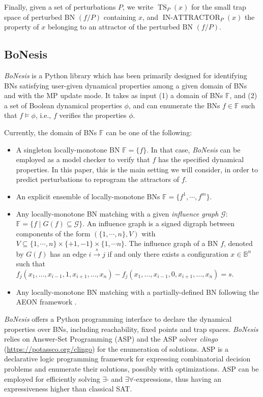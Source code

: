 \documentclass[PCJ,Unicode,screen,mode=plain]{cedram}
\begin{document}
Finally, given a set of perturbations \(P\), we write
\(\operatorname{TS}_P(x)\) for the small trap space of perturbed BN
\((f/P)\) containing \(x\), and \(\operatorname{IN-ATTRACTOR}_P(x)\) the
property of \(x\) belonging to an attractor of the perturbed BN
\((f/P)\).
\hypertarget{bonesis}{%
\subsection{BoNesis}\label{bonesis}}

\emph{BoNesis} \citep{BoNesis} is a Python library which has been primarily designed for identifying BNs satisfying
user-given dynamical properties among a given domain of BNs and with the MP update mode. It takes as
input (1) a domain of BNs
\(\mathbb F\), and (2) a set of Boolean dynamical properties \(\phi\),
and can enumerate the BNs \(f \in \mathbb F\) such that
\(f\models \phi\), i.e., \(f\) verifies the properties \(\phi\).

Currently, the domain of BNs \(\mathbb F\) can be one of the following:

\begin{itemize}
\item
  A singleton locally-monotone BN \(\mathbb F=\{f\}\). In that case,
  \emph{BoNesis} can be employed as a model checker to verify that \(f\)
  has the specified dynamical properties. In this paper, this is the
  main setting we will consider, in order to predict perturbations to
  reprogram the attractors of \(f\).
\item
  An explicit ensemble of locally-monotone BNs
  \(\mathbb F=\{ f^1,\cdots, f^m \}\).
\item
  Any locally-monotone BN matching with a given \emph{influence graph}
  \(\mathcal G\): \(\mathbb F = \{ f\mid G(f)\subseteq \mathcal G\}\).
  An influence graph is a signed digraph between components of
  the form \((\{1,\cdots,n\},V)\) with
  \(V\subseteq \{1,\cdots,n\}\times \{+1,-1\}\times \{1,\cdots n\}\).
  The influence graph of a BN \(f\), denoted by \(G(f)\) has an edge
  \(i\xrightarrow{s} j\) if and only there exists a configuration
  \(x\in\mathbb B^n\) such that
  \(f_j(x_1, \ldots, x_{i-1}, 1, x_{i+1},\ldots, x_n) - f_j(x_1, \ldots, x_{i-1}, 0, x_{i+1},\ldots, x_n) = s\).
\item
  Any locally-monotone BN matching with a partially-defined BN following
  the AEON framework \citep{Benes2021}.
\end{itemize}

\emph{BoNesis} offers a Python programming interface to declare the
dynamical properties over BNs, including reachability, fixed points and
trap spaces. \emph{BoNesis} relies on Answer-Set Programming (ASP) and
the ASP solver \emph{clingo} (\href{https://potassco.org/clingo}{https://potassco.org/clingo}) for the
enumeration of solutions. ASP is a declarative logic programming
framework for expressing combinatorial decision problems and enumerate
their solutions, possibly with optimizations. ASP can be employed for
efficiently solving \(\exists\)- and \(\exists\forall\)-expressions,
thus having an expressiveness higher than classical SAT.
\end{document}
